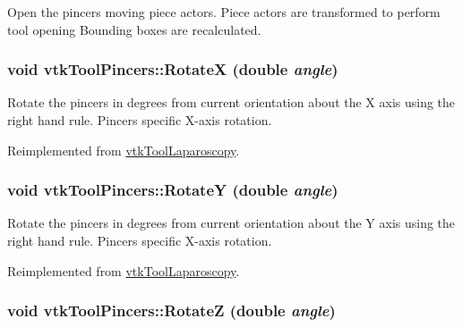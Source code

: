 Open the pincers moving piece actors. Piece actors are transformed to perform tool opening Bounding boxes are recalculated. \hypertarget{classvtkToolPincers_ac6b80a0c7a43ae67cfafbe29772b41d0}{
\subsubsection[{RotateX}]{\setlength{\rightskip}{0pt plus 5cm}void vtkToolPincers::RotateX (double {\em angle})}}
\label{classvtkToolPincers_ac6b80a0c7a43ae67cfafbe29772b41d0}


Rotate the pincers in degrees from current orientation about the X axis using the right hand rule. Pincers specific X-\/axis rotation. 

Reimplemented from \hyperlink{classvtkToolLaparoscopy_a6894dddee203102828358697e8214974}{vtkToolLaparoscopy}.\hypertarget{classvtkToolPincers_aa2a15405aa65c96dd971e3c06d98d197}{
\subsubsection[{RotateY}]{\setlength{\rightskip}{0pt plus 5cm}void vtkToolPincers::RotateY (double {\em angle})}}
\label{classvtkToolPincers_aa2a15405aa65c96dd971e3c06d98d197}


Rotate the pincers in degrees from current orientation about the Y axis using the right hand rule. Pincers specific X-\/axis rotation. 

Reimplemented from \hyperlink{classvtkToolLaparoscopy_ae0245eaa9aa765a675da5135c4af422a}{vtkToolLaparoscopy}.\hypertarget{classvtkToolPincers_ad7a4a9f0e3291b88eb4e30986784539a}{
\subsubsection[{RotateZ}]{\setlength{\rightskip}{0pt plus 5cm}void vtkToolPincers::RotateZ (double {\em angle})}}
\label{classvtkToolPincers_ad7a4a9f0e3291b88eb4e30986784539a}



